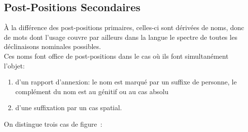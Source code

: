 \documentclass{cours}
\begin{document}
\subsection{Post-Positions Secondaires}
À  la différence des post-positions \og primaires\fg, celles-ci sont dérivées de noms, donc de mots dont l'usage couvre par ailleurs dans la langue le spectre de toutes les déclinaisons nominales possibles.\\
Ces noms font office de post-positions dans le cas où ils font simultanément l'objet:
\begin{enumerate}
    \item d'un rapport d'annexion: le nom est marqué par un suffixe de personne, le complément du nom est au génitif ou au cas absolu
    \item d'une suffixation par un cas spatial.
\end{enumerate}
On distingue trois cas de figure~:
\end{document}
